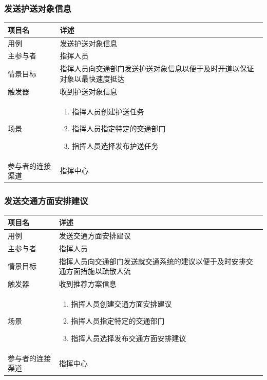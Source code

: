 \documentclass{ctexrep}
\begin{document}
\subsubsection{发送护送对象信息}
\begin{longtable}{p{2cm} | p{10cm}}
\hline
项目名 & 详述 \\
\hline
\hline
用例 & 发送护送对象信息\\
\hline
主参与者 & 指挥人员 \\
\hline
情景目标 &  指挥人员向交通部门发送护送对象信息以便于及时开道以保证对象以最快速度抵达\\
\hline
触发器 &  收到护送对象信息\\
\hline
场景 & \begin{enumerate}
	\item 指挥人员创建护送任务
	\item 指挥人员指定特定的交通部门
	\item 指挥人员选择发布护送任务
\end{enumerate} \\
\hline
参与者的连接渠道 & 指挥中心 \\
\hline
\end{longtable}

\subsubsection{发送交通方面安排建议}
\begin{longtable}{p{2cm} | p{10cm}}
\hline
项目名 & 详述 \\
\hline
\hline
用例 & 发送交通方面安排建议\\
\hline
主参与者 & 指挥人员 \\
\hline
情景目标 &  指挥人员向交通部门发送就交通系统的建议以便于及时安排交通方面措施以疏散人流\\
\hline
触发器 &  收到推荐方案信息\\
\hline
场景 & \begin{enumerate}
	\item 指挥人员创建交通方面安排建议
	\item 指挥人员指定特定的交通部门
	\item 指挥人员选择发布交通方面安排建议
\end{enumerate} \\
\hline
参与者的连接渠道 & 指挥中心 \\
\hline
\end{longtable}
\end{document}
